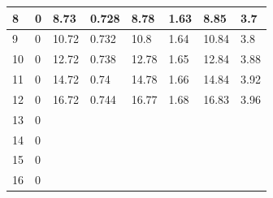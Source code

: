 \documentclass[10pt, a4j, dvipdfmx]{jarticle}
\begin{document}
\begin{table}[H]
\begin{tabular}{|l|l|l|l|l|l|l|l|}
        8                         & 0              & 8.73                      & 0.728          & 8.78                      & 1.63            & 8.85                      & 3.7             \\ \hline
        9                         & 0              & 10.72                     & 0.732          & 10.8                      & 1.64            & 10.84                     & 3.8             \\ \hline
        10                        & 0              & 12.72                     & 0.738          & 12.78                     & 1.65            & 12.84                     & 3.88            \\ \hline
        11                        & 0              & 14.72                     & 0.74           & 14.78                     & 1.66            & 14.84                     & 3.92            \\ \hline
        12                        & 0              & 16.72                     & 0.744          & 16.77                     & 1.68            & 16.83                     & 3.96            \\ \hline
        13                        & 0              &                           &                &                           &                 &                           &                 \\ \hline
        14                        & 0              &                           &                &                           &                 &                           &                 \\ \hline
        15                        & 0              &                           &                &                           &                 &                           &                 \\ \hline
        16                        & 0              &                           &                &                           &                 &                           &                 \\ \hline
        \end{tabular}
        \normalsize
    \end{table}
\end{document}
